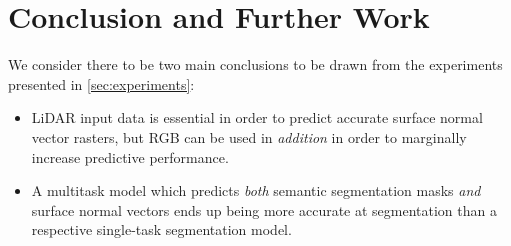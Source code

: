 \chapter*{Conclusion and Further Work}

We consider there to be two main conclusions to be drawn from the experiments presented in \cref{sec:experiments}:
\begin{itemize}
  \item LiDAR input data is essential in order to predict accurate surface normal vector rasters, but RGB can be used in \emph{addition} in order to marginally increase predictive performance.
  \item A multitask model which predicts \emph{both} semantic segmentation masks \emph{and} surface normal vectors ends up being more accurate at segmentation than a respective single-task segmentation model.
\end{itemize}

